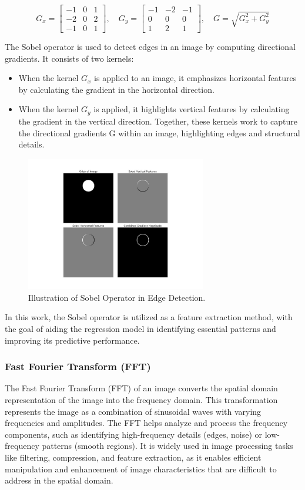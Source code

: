 \documentclass[twoside,11pt]{article}
\begin{document}
\[
G_x =
\begin{bmatrix}
-1 & 0 & 1 \\
-2 & 0 & 2 \\
-1 & 0 & 1
\end{bmatrix},
\quad
G_y =
\begin{bmatrix}
-1 & -2 & -1 \\
0 &  0 &  0 \\
1 &  2 &  1
\end{bmatrix},
\quad G =
\sqrt{G_x^2 + G_y^2}
\]

The Sobel operator is used to detect edges in an image by computing directional gradients. It consists of two kernels:
\begin{itemize}
\item When the kernel  $G_x$ is applied to an image, it emphasizes horizontal features by calculating the gradient in the horizontal direction.
\item When the kernel  $G_y$  is applied, it highlights vertical features by calculating the gradient in the vertical direction.
Together, these kernels work to capture the directional gradients G within an image, highlighting edges and structural details.
\end{itemize}

\begin{figure}[H]
\centering
\includegraphics[width=0.7\textwidth]{figure2.jpg}
\caption{Illustration of Sobel Operator in Edge Detection.}
\end{figure}

In this work, the Sobel operator is utilized as a feature extraction method, with the goal of aiding the regression model in identifying essential patterns and improving its predictive performance.

\subsubsection{Fast Fourier Transform (FFT)}
The Fast Fourier Transform (FFT) of an image converts the spatial domain representation of the image into the frequency domain. This transformation represents the image as a combination of sinusoidal waves with varying frequencies and amplitudes. The FFT helps analyze and process the frequency components, such as identifying high-frequency details (edges, noise) or low-frequency patterns (smooth regions). It is widely used in image processing tasks like filtering, compression, and feature extraction, as it enables efficient manipulation and enhancement of image characteristics that are difficult to address in the spatial domain.
\end{document}
